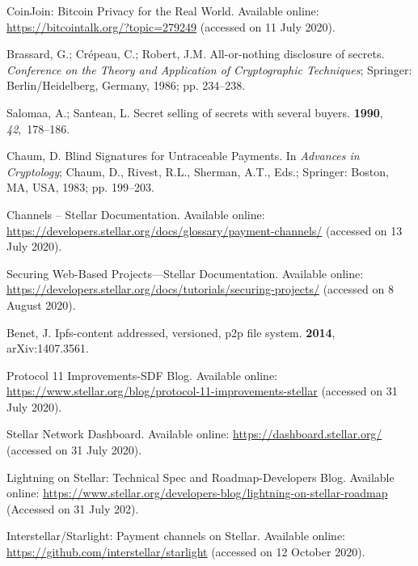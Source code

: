 \documentclass[applsci,article,accept,moreauthors,pdftex]{Definitions/mdpi}
\begin{document}
\begin{thebibliography}{999}
CoinJoin: Bitcoin Privacy for the Real World. Available online: 
\newblock \url{https://bitcointalk.org/?topic=279249}  (accessed on 11 July 2020).

Brassard, G.; Cr{\'e}peau, C.; Robert, J.M.
\newblock All-or-nothing disclosure of secrets.
\newblock  \emph{Conference on the Theory and Application of Cryptographic
  Techniques}; Springer:  {Berlin/Heidelberg, Germany,} %
  1986; pp. 234--238.

Salomaa, A.; Santean, L.
\newblock Secret selling of secrets with several buyers.
 {\bf 1990}, {\em 42},~178--186.

Chaum, D.
\newblock Blind Signatures for Untraceable Payments.
\newblock  In \emph{Advances in Cryptology}; Chaum, D., Rivest, R.L., Sherman, A.T.,
  Eds.; Springer: Boston, MA, USA, 1983; pp. 199--203.

Channels – Stellar Documentation. Available online: 
\newblock \url{https://developers.stellar.org/docs/glossary/payment-channels/} (accessed on 13 July 2020).

Securing Web-Based Projects---Stellar Documentation. Available online: 
\newblock
  \url{https://developers.stellar.org/docs/tutorials/securing-projects/}  (accessed on 8 August 2020).

Benet, J.
\newblock Ipfs-content addressed, versioned, p2p file system.
 {\bf 2014},  arXiv:1407.3561.

Protocol 11 Improvements-SDF Blog. Available online: 
\newblock \url{https://www.stellar.org/blog/protocol-11-improvements-stellar}  (accessed on 31 July 2020).

Stellar Network Dashboard. Available online: 
\newblock \url{https://dashboard.stellar.org/}  (accessed on 31 July 2020).

Lightning on Stellar: Technical Spec and Roadmap-Developers Blog. Available online: 
\newblock
  \url{https://www.stellar.org/developers-blog/lightning-on-stellar-roadmap}  (Accessed on 31 July 202).

Interstellar/Starlight: Payment channels on Stellar. Available online:
\newblock \url{https://github.com/interstellar/starlight}  (accessed on 12 October 2020).


\end{thebibliography}
\end{document}
